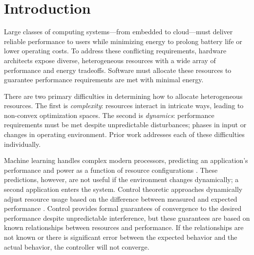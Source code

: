 \section{Introduction}
Large classes of computing systems---from embedded to cloud---must
deliver reliable performance to users while minimizing energy to
prolong battery life or lower operating costs.  To address these
conflicting requirements, hardware architects expose diverse,
heterogeneous resources with a wide array of performance and energy
tradeoffs.  Software must allocate these resources to guarantee
performance requirements are met with minimal energy.


There are two primary difficulties in determining how to allocate
heterogeneous resources.  The first is \emph{complexity}: resources
interact in intricate ways, leading to non-convex optimization
spaces.  The second is \emph{dynamics}: perfor\-mance requirements
must be met despite unpredictable disturbances; \eg{} phases in input
or changes in operating environment.  Prior work addresses each of
these difficulties individually.

Machine learning handles complex modern processors, predicting an
application's performance and power as a function of resource
configurations
\cite{reddiHPCA2013,dubach2010,Bitirgen2008,Ipek,Koala,LEO,Flicker,Ponamarev,Paragon}.
These predictions, however, are not useful if the environment changes
dynamically; \eg{} a second application enters the system.  Control
theoretic approaches dynamically adjust resource usage based on the
difference between measured and expected performance
\cite{Hellerstein2004a,Chen2011,POET,ControlWare,Agilos,grace2,JouleGuard}.
Control provides formal guarantees of convergence to the desired
performance despite unpredictable interference, but these guarantees
are based on known relationships between resources and performance.
If the relationships are not known or there is significant error
between the expected behavior and the actual behavior, the controller
will not converge.

